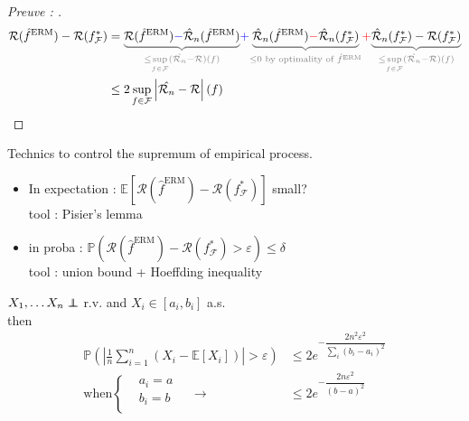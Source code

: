 \begin{proof}[Preuve : ]
    \begin{align*}
        \mathcal{R} (\hat{f}^{\text{ERM}}) - \mathcal{R}(f^\ast _{\mathcal{F}}) 
        & = \textcolor{gray}{\underbrace{\color{black} \mathcal{R} (\hat{f}^{\text{ERM}}) \textcolor{blue}{-} \hat{\mathcal{R}}_n(\hat{f}^{\text{ERM}})}_{\leq \sup\limits_{f \in \mathcal{F}} ( \hat{\mathcal{R}_n} - \mathcal{R} ) (f) } }
        \textcolor{blue}{+} \textcolor{gray}{\underbrace{ \color{black} \hat{\mathcal{R}}_n(\hat{f}^{\text{ERM}}) \textcolor{red}{-} \hat{\mathcal{R}}_n(f^\ast_ \mathcal{F} ) }_{\leq 0 \text{ by optimality of } \hat{f}^{\text{ERM}} }}
        \textcolor{red}{+} \textcolor{gray}{\underbrace{ \color{black} \hat{\mathcal{R}}_n(f^\ast_ \mathcal{F} ) - \mathcal{R}(f^\ast _{\mathcal{F}}) }_{\leq \sup\limits_{f \in \mathcal{F}} ( \hat{\mathcal{R}_n} - \mathcal{R} ) (f) }} \\
        &\leq 2 \sup_{f \in \mathcal{F}} \left| \hat{\mathcal{R}_n} - \mathcal{R} \right| (f)
    \end{align*}
\end{proof}


Technics to control the supremum of empirical process.
\begin{itemize}
    \item In expectation : $\mathbb{E}[ \mathcal{R}(\hat{f}^\text{ERM}) - \mathcal{R}(f^\ast _{\mathcal{F}})]$ small? \\
    tool : Pisier's lemma
    \item in proba : $\mathbb{P}(\mathcal{R}(\hat{f}^\text{ERM}) - \mathcal{R}(f^\ast _{\mathcal{F}}) > \varepsilon ) \leq \delta $ \\
    tool : union bound + Hoeffding inequality
\end{itemize}

\begin{thm}
    $X_1, \dots X_n \perp\!\!\!\!\perp$ r.v. and $X_i \in [a_i, b_i]$ a.s. \\
    then \begin{align*}
        \mathbb{P}(\left| \frac{1}{n} \sum_{i=1}^{n} (X_i - \mathbb{E}[X_i]) \right| > \varepsilon ) 
        & \leq 2 e^{-\dfrac{2 n ^2 \varepsilon ^2}{\sum_{i}^{} (b_i - a_i)^2}} \\
        \text{when} \begin{cases}
             &a_i =a\\
             &b_i =b\\
        \end{cases} \quad \rightarrow  & \leq  2 e^{-\dfrac{2 n \varepsilon ^2}{(b - a)^2}}
    \end{align*} 
\end{thm}

